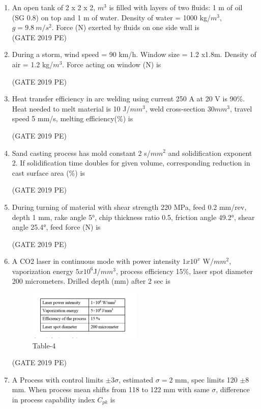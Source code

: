 \documentclass[journal,12pt,onecolumn]{exam}
\theoremstyle{remark}
\begin{document}
\begin{enumerate}
\item An open tank of 2 x 2 x 2, $m^3$ is filled with layers of two fluids: 1 m of oil (SG 0.8) on top and 1 m of water. Density of water = 1000 kg/$m^3$, \(g=9.8\ m/s^2\). Force (N) exerted by fluids on one side wall is\\

\hfill{(GATE 2019 PE)}\\
\item During a storm, wind speed = 90 km/h. Window size = 1.2 x1.8m. Density of air = 1.2 kg/$m^3$. Force acting on window (N) is

\hfill{(GATE 2019 PE)}\\

\item Heat transfer efficiency in arc welding using current 250 A at 20 V is 90\%. Heat needed to melt material is 10 J/$mm^3$, weld cross-section 30$mm^3$, travel speed 5 mm/s, melting efficiency(\%) is

\hfill{(GATE 2019 PE)}\\

\item Sand casting process has mold constant 2 s/$mm^2$ and solidification exponent 2. If solidification time doubles for given volume, corresponding reduction in cast surface area (\%) is

\hfill{(GATE 2019 PE)}\\


\item During turning of material with shear strength 220 MPa, feed 0.2 mm/rev, depth 1 mm, rake angle 5°, chip thickness ratio 0.5, friction angle 49.2°, shear angle 25.4°, feed force (N) is

\hfill{(GATE 2019 PE)}\\

\item  A CO2 laser in continuous mode with power intensity $1x10^{x}$ W/$mm^2$, vaporization energy $5x10^{6}$J/$mm^3$, process efficiency 15\%, laser spot diameter 200 micrometers. Drilled depth (mm) after 2 sec is\\
\begin{figure}[H]
    \centering
    \includegraphics[width=0.5\linewidth]{figs/fig6.png}
    \caption{Table-4}
    \label{fig:figs/fig6.png}
\end{figure}
\hfill{(GATE 2019 PE)}\\
\item A Process with control limits \(\pm 3\sigma\), estimated \(\sigma=2\) mm, spec limits 120 \(\pm 8\) mm. When process mean shifts from 118 to 122 mm with same \(\sigma\), difference in process capability index \(C_{pk}\) is\\


\end{enumerate}
\end{document}
